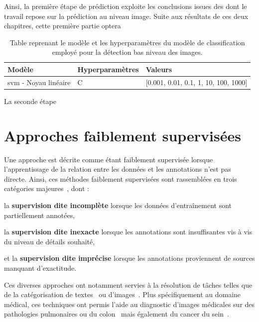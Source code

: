 Ainsi, la première étape de prédiction exploite les conclusions issues des  dont le travail repose sur la prédiction au niveau image. Suite aux résultats de ces deux chapitres, cette première partie optera    \par

\begin{table}[H]
    \centering
    \begin{tabular}{lll}
        \toprule
        \textbf{Modèle}                                 & \textbf{Hyperparamètres}  & \textbf{Valeurs}                          \\ \midrule
        \gls{svm} - Noyau linéaire                      & C                         & [0.001, 0.01, 0.1, 1, 10, 100, 1000]      \\ 
        \bottomrule 
    \end{tabular} 
    \caption{Table reprenant le modèle et les hyperparamètres du modèle de classification employé pour la détection bas niveau des images.}
    \label{tab:parameters_lesion_classification_image_supervised}
\end{table}\par

La seconde étape
\clearpage

\section{Approches faiblement supervisées}
Une approche est décrite comme étant faiblement supervisée lorsque l'apprentissage de la relation entre les données et les annotations n'est pas directe. Ainsi, ces méthodes faiblement supervisées sont rassemblées en trois catégories majeures~\cite{Zhou2018}, dont :
\begin{inlinerate}
    \item la \textbf{supervision dite incomplète} lorsque les données d'entraînement sont partiellement annotées,
    \item la \textbf{supervision dite inexacte} lorsque les annotations sont insuffisantes vis à vis du niveau de détails souhaité,
    \item et la \textbf{supervision dite imprécise} lorsque les annotations proviennent de sources manquant d'exactitude.
\end{inlinerate} Ces diverses approches ont notamment servies à la résolution de tâches telles que de la catégorisation de textes~\cite{Andrews2003,Settles2008} ou d'images~\cite{Chen2004,Tang2009}. Plus spécifiquement au domaine médical, ces techniques ont permis l'aide au diagnostic d'images médicales sur des pathologies pulmonaires ou du colon~\cite{Dundar2007} mais également du cancer du sein~\cite{Sudharshan2019}.\par

